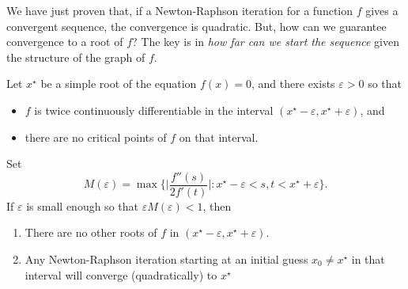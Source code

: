 \begin{remark} 
We have just proven that, if a Newton-Raphson iteration for a function $f$ gives a convergent sequence, the convergence is quadratic.  But, how can we guarantee convergence to a root of $f$?  The key is in \emph{how far can we start the sequence} given the structure of the graph of $f$.
\end{remark}

\begin{theorem}\label{theorem:LCNR}
Let $x^\star$ be a simple root of the equation $f(x)=0$, and there exists $\varepsilon > 0$ so that 
\begin{itemize}
	\item $f$ is twice continuously differentiable in the interval $(x^\star-\varepsilon, x^\star + \varepsilon)$, and
	\item there are no critical points of $f$ on that interval.
\end{itemize}  
Set
\begin{equation*}
M(\varepsilon) = \max \bigg\{ \bigg\lvert \frac{f''(s)}{2f'(t)} \bigg\rvert : x^\star -\varepsilon < s,t < x^\star + \varepsilon \bigg\}.
\end{equation*}
If $\varepsilon$ is small enough so that $\varepsilon M(\varepsilon) < 1$, then 
\begin{enumerate}
	\item \label{thm:LCNR1} There are no other roots of $f$ in $(x^\star -\varepsilon, x^\star+\varepsilon)$.
	\item \label{thm:LCNR2} Any Newton-Raphson iteration starting at an initial guess $x_0 \neq x^\star$ in that interval will converge (quadratically) to $x^\star$
\end{enumerate} 
\end{theorem}
